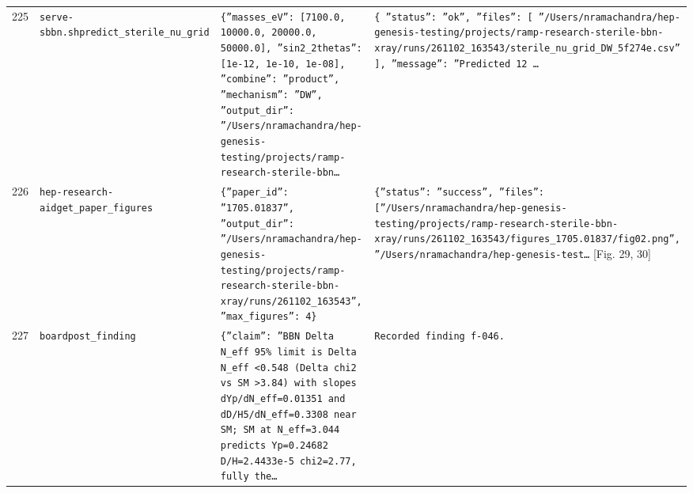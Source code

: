 \documentclass[11pt,a4paper]{article}
\begin{document}
\begin{longtable}{@{}p{}p{}p{}p{}@{}}
225 & \texttt{serve-sbbn.sh}\newline\texttt{predict\_\allowbreak{}sterile\_\allowbreak{}nu\_\allowbreak{}grid} & \texttt{\{''masses\_\allowbreak{}eV'':\allowbreak{} [7100.0,\allowbreak{} 10000.0,\allowbreak{} 20000.0,\allowbreak{} 50000.0]\allowbreak{},\allowbreak{} ''sin2\_\allowbreak{}2thetas'':\allowbreak{} [1e-12,\allowbreak{} 1e-10,\allowbreak{} 1e-08]\allowbreak{},\allowbreak{} ''combine'':\allowbreak{} ''product'',\allowbreak{} ''mechanism'':\allowbreak{} ''DW'',\allowbreak{} ''output\_\allowbreak{}dir'':\allowbreak{} ''/\allowbreak{}Users/\allowbreak{}nramachandra/\allowbreak{}hep-genesis-testing/\allowbreak{}projects/\allowbreak{}ramp-research-sterile-bbn\ldots{}\allowbreak{}} & \texttt{\{   ''status'':\allowbreak{} ''ok'',\allowbreak{}   ''files'':\allowbreak{} [     ''/\allowbreak{}Users/\allowbreak{}nramachandra/\allowbreak{}hep-genesis-testing/\allowbreak{}projects/\allowbreak{}ramp-research-sterile-bbn-xray/\allowbreak{}runs/\allowbreak{}261102\_\allowbreak{}163543/\allowbreak{}sterile\_\allowbreak{}nu\_\allowbreak{}grid\_\allowbreak{}DW\_\allowbreak{}5f274e.csv''   ]\allowbreak{},\allowbreak{}   ''message'':\allowbreak{} ''Predicted 12 \ldots{}\allowbreak{}} \\
226 & \texttt{hep-research-aid}\newline\texttt{get\_\allowbreak{}paper\_\allowbreak{}figures} & \texttt{\{''paper\_\allowbreak{}id'':\allowbreak{} ''1705.01837'',\allowbreak{} ''output\_\allowbreak{}dir'':\allowbreak{} ''/\allowbreak{}Users/\allowbreak{}nramachandra/\allowbreak{}hep-genesis-testing/\allowbreak{}projects/\allowbreak{}ramp-research-sterile-bbn-xray/\allowbreak{}runs/\allowbreak{}261102\_\allowbreak{}163543'',\allowbreak{} ''max\_\allowbreak{}figures'':\allowbreak{} 4\}\allowbreak{}} & \texttt{\{''status'':\allowbreak{} ''success'',\allowbreak{} ''files'':\allowbreak{} [''/\allowbreak{}Users/\allowbreak{}nramachandra/\allowbreak{}hep-genesis-testing/\allowbreak{}projects/\allowbreak{}ramp-research-sterile-bbn-xray/\allowbreak{}runs/\allowbreak{}261102\_\allowbreak{}163543/\allowbreak{}figures\_\allowbreak{}1705.01837/\allowbreak{}fig02.png'',\allowbreak{} ''/\allowbreak{}Users/\allowbreak{}nramachandra/\allowbreak{}hep-genesis-test\ldots{}\allowbreak{}} [Fig. 29, 30] \\
227 & \texttt{board}\newline\texttt{post\_\allowbreak{}finding} & \texttt{\{''claim'':\allowbreak{} ''BBN Delta N\_\allowbreak{}eff 95\% limit is Delta N\_\allowbreak{}eff \textless{}\allowbreak{}0.548 (Delta chi2 vs SM \textgreater{}\allowbreak{}3.84)\allowbreak{} with slopes dYp/\allowbreak{}dN\_\allowbreak{}eff=\allowbreak{}0.01351 and dD/\allowbreak{}H5/\allowbreak{}dN\_\allowbreak{}eff=\allowbreak{}0.3308 near SM;\allowbreak{} SM at N\_\allowbreak{}eff=\allowbreak{}3.044 predicts Yp=\allowbreak{}0.24682 D/\allowbreak{}H=\allowbreak{}2.4433e-5 chi2=\allowbreak{}2.77,\allowbreak{} fully the\ldots{}\allowbreak{}} & \texttt{Recorded finding f-046.} \\

\end{longtable}
\end{document}
